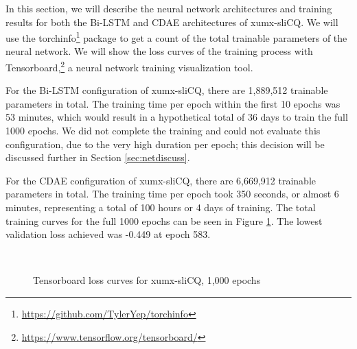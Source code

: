 \documentclass[report.tex]{subfiles}
\begin{document}
In this section, we will describe the neural network architectures and training results for both the Bi-LSTM and CDAE architectures of xumx-sliCQ. We will use the torchinfo\footnote{\url{https://github.com/TylerYep/torchinfo}} package to get a count of the total trainable parameters of the neural network. We will show the loss curves of the training process with Tensorboard,\footnote{\url{https://www.tensorflow.org/tensorboard/}} a neural network training visualization tool.

For the Bi-LSTM configuration of xumx-sliCQ, there are 1,889,512 trainable parameters in total. The training time per epoch within the first 10 epochs was 53 minutes, which would result in a hypothetical total of 36 days to train the full 1000 epochs. We did not complete the training and could not evaluate this configuration, due to the very high duration per epoch; this decision will be discussed further in Section \ref{sec:netdiscuss}.

For the CDAE configuration of xumx-sliCQ, there are 6,669,912 trainable parameters in total. The training time per epoch took 350 seconds, or almost 6 minutes, representing a total of 100 hours or 4 days of training. The total training curves for the full 1000 epochs can be seen in Figure \ref{fig:networkloss}. The lowest validation loss achieved was -0.449 at epoch 583.

\begin{figure}[ht]
	\centering
	\\
	\caption{Tensorboard loss curves for xumx-sliCQ, 1,000 epochs}
	\label{fig:networkloss}
\end{figure}
\end{document}
